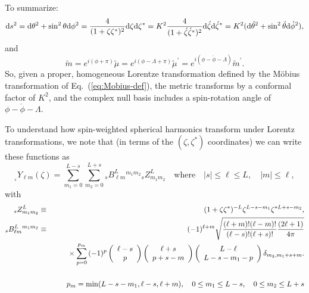 \documentclass[11pt]{article}
\newcommand{\swY}[4][]{{}_{{}_{#2}}\!Y^{#1}_{#3}(#4)}
\begin{document}
To summarize:
\begin{equation}\label{eq:LorentzMetricTrans}
{\rm d}s^2 = {\rm d}\theta^2+\sin^2\theta{\rm d}\phi^2
     = \frac4{(1+\zeta\zeta^*)^2}{\rm d}\zeta{\rm d}\zeta^*
     =  K^2\frac4{(1+\acute\zeta\acute\zeta^*)^2}
              {\rm d}\acute\zeta{\rm d}\acute\zeta^*
     = K^2({\rm d}\acute\theta^2+\sin^2\acute\theta{\rm d}\acute\phi^2),
\end{equation}
and
\begin{equation}
\tilde{m} = e^{i(\phi+\pi)}\tilde\mu
     = e^{i(\phi-\Lambda+\pi)}\tilde\mu^\prime
     = e^{i(\phi-\acute\phi-\Lambda)}\tilde{m}^\prime.
\end{equation}
So, given a proper, homogeneous Lorentze transformation defined by the
M\"{o}bius transformation of Eq.~(\ref{eq:Mobius-def}), the metric
transforms by a conformal factor of $K^2$, and the complex null basis
includes a spin-rotation angle of $\phi-\acute\phi-\Lambda$.

To understand how spin-weighted spherical harmonics transform under 
Lorentz transformations, we note that (in terms of the $(\zeta,\zeta^*)$
coordinates) we can write these functions as
\begin{equation}
  \swY{s}{\ell m}{\zeta} = \sum_{m_1=0}^{L-s}{\sum_{m_2=0}^{L+s}{
      {}_sB^L_{\ell m}{}^{m_1m_2}{}_sZ^L_{m_1m_2}}}
\quad\mbox{where}\quad |s|\le\ell\le L,\quad |m|\le\ell,
\end{equation}
with
\begin{eqnarray}
 {}_sZ^L_{m_1m_2}&\equiv&(1+\zeta\zeta^*)^{-L}\zeta^{L-s-m_1}\zeta^{*L+s-m_2}, \\
{}_sB^L_{\ell m}{}^{m_1m_2} &\equiv&
    (-1)^{\ell+m}\sqrt{\frac{(\ell+m)!(\ell-m)!}{(\ell-s)!(\ell+s)!}
  \frac{(2\ell+1)}{4\pi}} \nonumber \\ &&\mbox{\hspace{0.25in}}
    \times\sum_{p=0}^{p_m}{(-1)^p
      \left(\begin{array}{c}\ell-s \\ p\end{array}\right)
        \left(\begin{array}{c}\ell+s \\ p+s-m\end{array}\right)
        \left(\begin{array}{c}L-\ell \\ L-s-m_1-p\end{array}\right)
          \delta_{m_2,m_1+s+m}}. \\ && \nonumber\\
    && p_m=\min(L-s-m_1,\ell-s,\ell+m),\quad
       0\le m_1\le L-s,\quad
       0\le m_2\le L+s\nonumber
\end{eqnarray}
\end{document}
